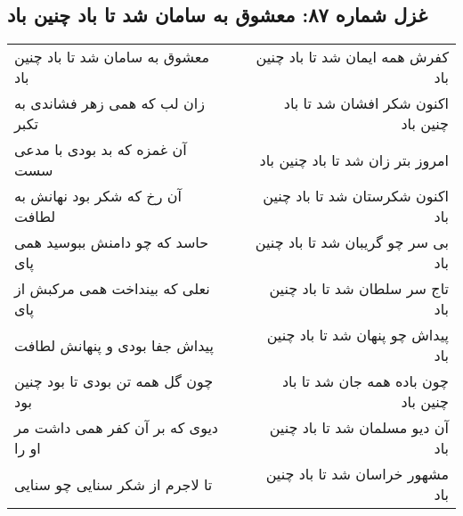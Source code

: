 \begin{center}
\section*{غزل شماره ۸۷: معشوق به سامان شد تا باد چنین باد}
\label{sec:087}
\begin{longtable}{l p{0.5cm} r}
معشوق به سامان شد تا باد چنین باد
&&
کفرش همه ایمان شد تا باد چنین باد
\\
زان لب که همی زهر فشاندی به تکبر
&&
اکنون شکر افشان شد تا باد چنین باد
\\
آن غمزه که بد بودی با مدعی سست
&&
امروز بتر زان شد تا باد چنین باد
\\
آن رخ که شکر بود نهانش به لطافت
&&
اکنون شکرستان شد تا باد چنین باد
\\
حاسد که چو دامنش ببوسید همی پای
&&
بی سر چو گریبان شد تا باد چنین باد
\\
نعلی که بینداخت همی مرکبش از پای
&&
تاج سر سلطان شد تا باد چنین باد
\\
پیداش جفا بودی و پنهانش لطافت
&&
پیداش چو پنهان شد تا باد چنین باد
\\
چون گل همه تن بودی تا بود چنین بود
&&
چون باده همه جان شد تا باد چنین باد
\\
دیوی که بر آن کفر همی داشت مر او را
&&
آن دیو مسلمان شد تا باد چنین باد
\\
تا لاجرم از شکر سنایی چو سنایی
&&
مشهور خراسان شد تا باد چنین باد
\\
\end{longtable}
\end{center}
